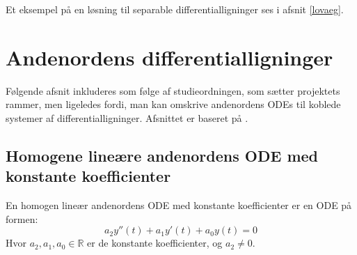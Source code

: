 Et eksempel på en løsning til separable differentialligninger ses i afsnit \ref{lovaeg}.  



\section{Andenordens differentialligninger}\label{andendiff}
Følgende afsnit inkluderes som følge af studieordningen, som sætter projektets rammer, men ligeledes fordi, man kan omskrive andenordens ODEs til koblede systemer af differentialligninger. Afsnittet er baseret på \citep[afsnit 4.2]{JAB}.
\subsection{Homogene lineære andenordens ODE med konstante koefficienter}
En homogen lineær andenordens ODE med konstante koefficienter er en ODE på formen: \hfill \break
\begin{equation}
\label{homlinandord}
    a_2y''(t)+a_1y'(t)+a_0y(t)=0
\end{equation} \hfill \break
Hvor $a_2,a_1,a_0\in \mathbb{R}$ er de konstante koefficienter, og $a_2\neq 0$. \hfill \break

